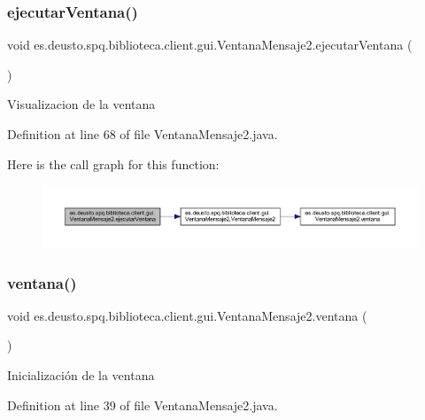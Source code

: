 \subsubsection{\texorpdfstring{ejecutar\+Ventana()}{ejecutarVentana()}}
{\footnotesize\ttfamily void es.\+deusto.\+spq.\+biblioteca.\+client.\+gui.\+Ventana\+Mensaje2.\+ejecutar\+Ventana (\begin{DoxyParamCaption}{ }\end{DoxyParamCaption})}

Visualizacion de la ventana 

Definition at line 68 of file Ventana\+Mensaje2.\+java.

Here is the call graph for this function\+:
\nopagebreak
\begin{figure}[H]
\begin{center}
\leavevmode
\includegraphics[width=350pt]{classes_1_1deusto_1_1spq_1_1biblioteca_1_1client_1_1gui_1_1_ventana_mensaje2_a5cfb6fe1ffdd87b816f2fb653f5a172a_cgraph}
\end{center}
\end{figure}
\mbox{\label{classes_1_1deusto_1_1spq_1_1biblioteca_1_1client_1_1gui_1_1_ventana_mensaje2_a58e122a68c01e47a8ef6f9e9e2d54ca3}} 
\subsubsection{\texorpdfstring{ventana()}{ventana()}}
{\footnotesize\ttfamily void es.\+deusto.\+spq.\+biblioteca.\+client.\+gui.\+Ventana\+Mensaje2.\+ventana (\begin{DoxyParamCaption}{ }\end{DoxyParamCaption})}

Inicialización de la ventana 

Definition at line 39 of file Ventana\+Mensaje2.\+java.

